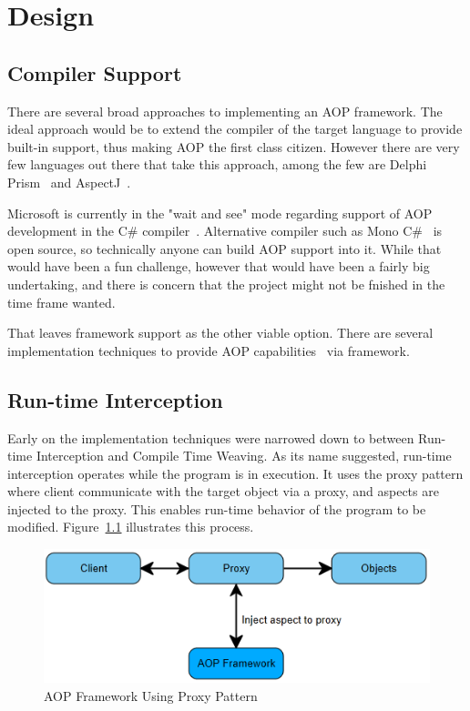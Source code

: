 \chapter{Design}

\section{Compiler Support}

There are several broad approaches to implementing an AOP framework. The ideal approach would be to extend the compiler of the target language to provide built-in support, thus making AOP the first class citizen. However there are very few languages out there that take this approach, among the few are Delphi Prism~\cite{delphi_prism2010} and AspectJ~\cite{aspectj_faq, aspectj_text}. 

Microsoft is currently in the "wait and see" mode regarding support of AOP development in the C\# compiler~\cite{hejlsberg}. Alternative compiler such as Mono C\#~\cite{monocsharp} is open source, so technically anyone can build AOP support into it. While that would have been a fun challenge, however that would have been a fairly big undertaking, and there is concern that the project might not be fnished in the time frame wanted.

That leaves framework support as the other viable option. There are several implementation techniques to provide AOP capabilities~\cite{aopcs, postsharp, aspectcs} via framework.

\section{Run-time Interception}

Early on the implementation techniques were narrowed down to between Run-time Interception and Compile Time Weaving. As its name suggested, run-time interception operates while the program is in execution. It uses the proxy pattern where client communicate with the target object via a proxy, and aspects are injected to the proxy. This enables run-time behavior of the program to be modified. Figure~\ref{proxy_model} illustrates this process.

\begin{figure}[H]
  \includegraphics[scale=1.0]{Proxy.PNG}
  \centering
  \caption{AOP Framework Using Proxy Pattern\label{proxy_model}}
\end{figure}

